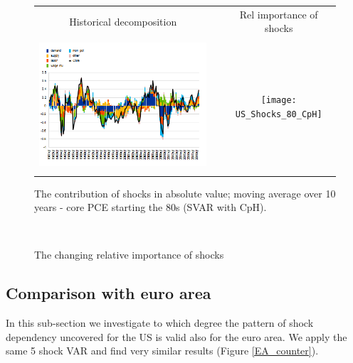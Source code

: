 \documentclass[11pt]{article}
\begin{document}
\begin{figure}[!h]%
\begin{center}
\begin{tabular}{ccc}
Historical decomposition &  & Rel importance of shocks \\
&  &  \\
\includegraphics[width=0.50%
\textwidth]{US_HistDecPCE_80_CpH} &  & %
\texttt{[image: US\_Shocks\_80\_CpH]} \\
\\
\end{tabular}
\parbox{1\textwidth}{\small The contribution of shocks in absolute value; moving average over 10 years - core PCE starting the 80s (SVAR with CpH).}\\
\caption{The changing relative importance of shocks}
\label{fig:Histdec}
\end{center}
\end{figure}


\subsection{Comparison with euro area}

In this sub-section we investigate to which degree the pattern of shock dependency uncovered for the US is valid also for the euro area. We apply the same 5 shock VAR and find very similar results (Figure \ref{EA_counter}). 
\end{document}
